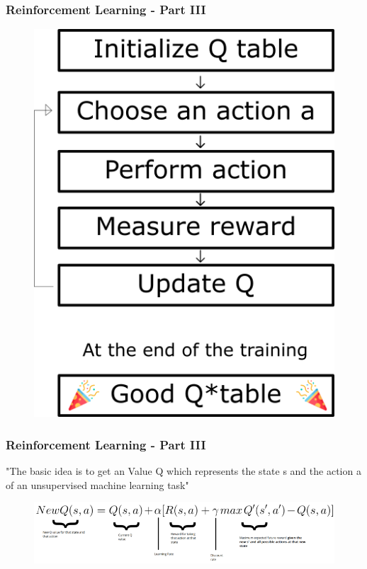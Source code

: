 \documentclass{beamer}
\begin{document}
%
%
\begin{frame}
\frametitle{Reinforcement Learning - Part III}
\begin{figure}
\includegraphics[width=0.4\linewidth]{photo/q}
\end{figure}
\end{frame}
%
%
\begin{frame}
\frametitle{Reinforcement Learning - Part III}
"The basic idea is to get an Value Q which represents the state s and the action a of an unsupervised machine learning task"\\
\begin{figure}
\includegraphics[width=0.9\linewidth]{photo/qformula}
\end{figure}
\end{frame}
%
\end{document}
